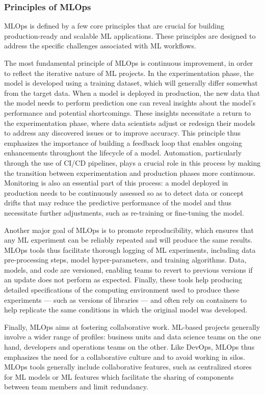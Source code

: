 \subsubsection{Principles of MLOps}
\label{sec:principles-mlops}

MLOps is defined by a few core principles that are crucial for building production-ready and scalable ML applications. These principles are designed to address the specific challenges associated with ML workflows.

The most fundamental principle of MLOps is continuous improvement, in order to reflect the iterative nature of ML projects. In the experimentation phase, the model is developed using a training dataset, which will generally differ somewhat from the target data. When a model is deployed in production, the new data that the model needs to perform prediction one can reveal insights about the model's performance and potential shortcomings. These insights necessitate a return to the experimentation phase, where data scientists adjust or redesign their models to address any discovered issues or to improve accuracy. This principle thus emphasizes the importance of building a feedback loop that enables ongoing enhancements throughout the lifecycle of a model. Automation, particularly through the use of CI/CD pipelines, plays a crucial role in this process by making the transition between experimentation and production phases more continuous. Monitoring is also an essential part of this process: a model deployed in production needs to be continuously assessed so as to detect data or concept drifts that may reduce the predictive performance of the model and thus necessitate further adjustments, such as re-training  or fine-tuning the model.

Another major goal of MLOps is to promote reproducibility, which ensures that any ML experiment can be reliably repeated and will produce the same results. MLOps tools thus facilitate thorough logging of ML experiments, including data pre-processing steps, model hyper-parameters, and training algorithms. Data, models, and code are versioned, enabling teams to revert to previous versions if an update does not perform as expected. Finally, these tools help producing detailed specifications of the computing environment used to produce these experiments — such as versions of libraries — and often rely on containers to help replicate the same conditions in which the original model was developed.

Finally, MLOps aims at fostering collaborative work. ML-based projects generally involve a wider range of profiles: business units and data science teams on the one hand, developers and operations teams on the other. Like DevOps, MLOps thus emphasizes the need for a collaborative culture and to avoid working in silos. MLOps tools generally include collaborative features, such as centralized stores for ML models or ML features which facilitate the sharing of components between team members and limit redundancy.

